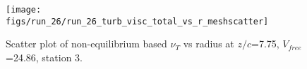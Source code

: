 \begin{figure}[H]
\centering
\texttt{[image: figs/run\_26/run\_26\_turb\_visc\_total\_vs\_r\_meshscatter]}
\caption{Scatter plot of non-equilibrium based $\nu_T$ vs radius at $z/c$=7.75, $V_{free}$=24.86, station 3.}
\label{fig:run_26_turb_visc_total_vs_r_meshscatter}
\end{figure}



